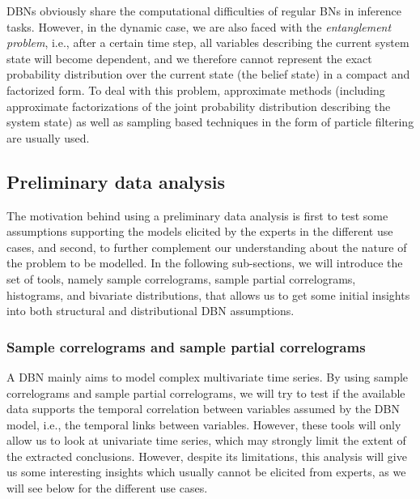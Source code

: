 DBNs obviously share the computational difficulties of regular BNs in inference tasks. However, in the dynamic case, we are also faced with the \textit{entanglement problem}, i.e., after a certain time step, all variables describing the current system state will become dependent, and we therefore cannot represent the exact probability distribution over the current state (the belief state) in a compact and factorized form. To deal with this problem, approximate methods (including approximate factorizations of the joint probability distribution describing the system state) \cite{BoyenKoller1998} as well as sampling based techniques in the form of particle filtering \cite{Doucet2000} are usually used.

\subsection{Preliminary data analysis}\label{SubSection:DataAnalysis}

The motivation behind using a preliminary data analysis is first to test some assumptions supporting the models elicited by the experts in the different use cases, and second, to further complement our understanding about the nature of the problem to be modelled. In the following sub-sections, we will introduce the set of tools, namely sample correlograms, sample partial correlograms, histograms, and bivariate distributions, that allows us to get some initial insights into both structural and distributional DBN assumptions.

\subsubsection{Sample correlograms and sample partial correlograms}

A DBN mainly aims to model complex multivariate time series. By using sample correlograms and sample partial correlograms, we will try to test if the available data supports the temporal correlation between variables assumed by the DBN model, i.e., the temporal links between variables. However, these tools will only allow us to look at univariate time series, which may strongly limit the extent of the extracted conclusions. However, despite its limitations, this analysis will give us some interesting insights which usually cannot be elicited from experts, as we will see below for the different use cases.  

